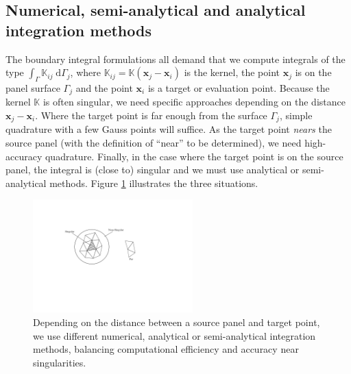 \documentclass[final,leqno,]{siamltex1213}
\newcommand{\K}{\mathbb{K}}
\newcommand{\di}[1]{\text{d}#1}
\newcommand{\vect}[1]{\mathbf{#1}}
\begin{document}
\subsection{Numerical, semi-analytical and analytical integration methods}

The boundary integral formulations all demand that we compute integrals of the type $\int_{\Gamma} \K_{ij}\;\di{\Gamma_j}$, where $\K_{ij}=\K(\vect{x}_j-\vect{x}_i)$ is the kernel, the point $\vect{x}_j$ is on the panel surface $\Gamma_j$ and the point $\vect{x}_i$ is a target or evaluation point. Because the kernel $\K$ is often singular, we need specific approaches depending on the distance $\vect{x}_j-\vect{x}_i$. Where the target point is far enough from the surface $\Gamma_j$, simple quadrature with a few Gauss points will suffice. As the target point \emph{nears} the source panel (with the definition of ``near'' to be determined), we need high-accuracy quadrature. Finally, in the case where the target point is on the source panel, the integral is (close to) singular and we must use analytical or semi-analytical methods. Figure \ref{fig:integration_domain} illustrates the three situations.

\begin{figure}[t]
	\begin{centering}
\includegraphics[natwidth=5.15in,natheight=2.6in,width=0.55\textwidth]{IntegrationDomain.pdf}
	\caption{Depending on the distance between a source panel and target point, we use different numerical, analytical or semi-analytical integration methods, balancing computational efficiency and accuracy near singularities.}
	\label{fig:integration_domain}
	\end{centering}
\end{figure}
\end{document}
